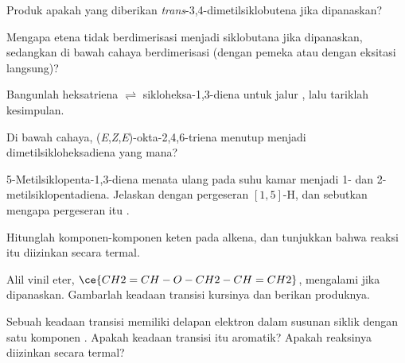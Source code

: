 \begin{exercise}[$\star$]\label{exo:b3:pericyclic:3}
Produk apakah yang diberikan \textit{trans}-3,4-dimetilsiklobutena jika dipanaskan?
\end{exercise}

\begin{exercise}[$\star$]\label{exo:b3:pericyclic:4}
Mengapa etena tidak berdimerisasi menjadi siklobutana jika dipanaskan, sedangkan di bawah cahaya
berdimerisasi (dengan pemeka atau dengan eksitasi langsung)?
\end{exercise}

\begin{exercise}[$\star\star$]\label{exo:b3:pericyclic:5}
Bangunlah  heksatriena $\rightleftharpoons$ sikloheksa-1,3-diena untuk
jalur , lalu tariklah kesimpulan.
\end{exercise}

\begin{exercise}[$\star\star$]\label{exo:b3:pericyclic:6}
Di bawah cahaya, (\textit{E},\textit{Z},\textit{E})-okta-2,4,6-triena menutup menjadi dimetilsikloheksadiena yang mana?
\end{exercise}

\begin{exercise}[$\star\star$]\label{exo:b3:pericyclic:7}
5-Metilsiklopenta-1,3-diena menata ulang pada suhu kamar menjadi 1- dan
2-metilsiklopentadiena. Jelaskan dengan pergeseran $[1,5]$-H, dan sebutkan mengapa pergeseran itu .
\end{exercise}

\begin{exercise}[$\star\star$]\label{exo:b3:pericyclic:8}
Hitunglah komponen-komponen  keten pada alkena, dan tunjukkan
bahwa reaksi itu diizinkan secara termal.
\end{exercise}

\begin{exercise}[$\star\star$]\label{exo:b3:pericyclic:9}
Alil vinil eter, $\ce{CH2=CH-O-CH2-CH=CH2}$, mengalami  jika
dipanaskan. Gambarlah keadaan transisi kursinya dan berikan produknya.
\end{exercise}

\begin{exercise}[$\star\star\star$]\label{exo:b3:pericyclic:10}
Sebuah keadaan transisi memiliki delapan elektron dalam susunan siklik dengan satu komponen
. Apakah keadaan transisi itu aromatik? Apakah reaksinya diizinkan secara termal?
\end{exercise}

